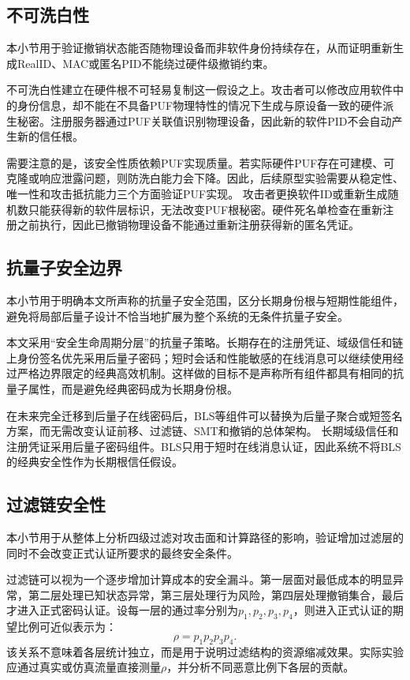 \documentclass[conference]{IEEEtran}
\begin{document}
	\subsection{不可洗白性}
	
	本小节用于验证撤销状态能否随物理设备而非软件身份持续存在，从而证明重新生成RealID、MAC或匿名PID不能绕过硬件级撤销约束。
	
	不可洗白性建立在硬件根不可轻易复制这一假设之上。攻击者可以修改应用软件中的身份信息，却不能在不具备PUF物理特性的情况下生成与原设备一致的硬件派生秘密。注册服务器通过PUF关联值识别物理设备，因此新的软件PID不会自动产生新的信任根。
	
	需要注意的是，该安全性质依赖PUF实现质量。若实际硬件PUF存在可建模、可克隆或响应泄露问题，则防洗白能力会下降。因此，后续原型实验需要从稳定性、唯一性和攻击抵抗能力三个方面验证PUF实现。
	攻击者更换软件ID或重新生成随机数只能获得新的软件层标识，无法改变PUF根秘密。硬件死名单检查在重新注册之前执行，因此已撤销物理设备不能通过重新注册获得新的匿名凭证。
	
	\subsection{抗量子安全边界}
	
	本小节用于明确本文所声称的抗量子安全范围，区分长期身份根与短期性能组件，避免将局部后量子设计不恰当地扩展为整个系统的无条件抗量子安全。
	
	本文采用“安全生命周期分层”的抗量子策略。长期存在的注册凭证、域级信任和链上身份签名优先采用后量子密码；短时会话和性能敏感的在线消息可以继续使用经过严格边界限定的经典高效机制。这样做的目标不是声称所有组件都具有相同的抗量子属性，而是避免经典密码成为长期身份根。
	
	在未来完全迁移到后量子在线密码后，BLS等组件可以替换为后量子聚合或短签名方案，而无需改变认证前移、过滤链、SMT和撤销的总体架构。
	长期域级信任和注册凭证采用后量子密码组件。BLS只用于短时在线消息认证，因此系统不将BLS的经典安全性作为长期根信任假设。
	
	\subsection{过滤链安全性}
	
	本小节用于从整体上分析四级过滤对攻击面和计算路径的影响，验证增加过滤层的同时不会改变正式认证所要求的最终安全条件。
	
	过滤链可以视为一个逐步增加计算成本的安全漏斗。第一层面对最低成本的明显异常，第二层处理已知状态异常，第三层处理行为风险，第四层处理撤销集合，最后才进入正式密码认证。设每一层的通过率分别为$p_1,p_2,p_3,p_4$，则进入正式认证的期望比例可近似表示为：
	\begin{equation}
		\rho=p_1p_2p_3p_4.
	\end{equation}
	该关系不意味着各层统计独立，而是用于说明过滤结构的资源缩减效果。实际实验应通过真实或仿真流量直接测量$\rho$，并分析不同恶意比例下各层的贡献。
	
\end{document}

